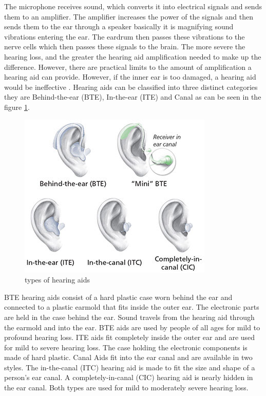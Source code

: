 \documentclass[sigconf]{acmart}
\begin{document}
The microphone receives sound, which converts it into electrical signals and sends them to an amplifier. The amplifier increases the power of the signals and then sends them to the ear through a speaker basically it is magnifying sound vibrations entering the ear. The eardrum then passes these vibrations to the nerve cells which then passes these signals to the brain. The more severe the hearing loss, and the greater the hearing aid amplification needed to make up the difference. However, there are practical limits to the amount of amplification a hearing aid can provide. However, if the inner ear is too damaged, a hearing aid would be ineffective \cite{NIHCD2017}.
\newline
Hearing aids can be classified into three distinct categories \cite{NIHCD2017} they are Behind-the-ear (BTE), In-the-ear (ITE) and Canal as can be seen in the figure \ref{f:typesofaids}.  
\begin{figure}[!ht]
  \centering\includegraphics[width=\columnwidth]{images/typesofaids.jpg}
  \caption{types of hearing aids}\label{f:typesofaids}
\end{figure}  
BTE hearing aids consist of a hard plastic case worn behind the ear and connected to a plastic earmold that fits inside the outer ear. The electronic parts are held in the case behind the ear. Sound travels from the hearing aid through the earmold and into the ear. BTE aids are used by people of all ages for mild to profound hearing loss. ITE aids fit completely inside the outer ear and are used for mild to severe hearing loss. The case holding the electronic components is made of hard plastic.  Canal Aids fit into the ear canal and are available in two styles. The in-the-canal (ITC) hearing aid is made to fit the size and shape of a person’s ear canal. A completely-in-canal (CIC) hearing aid is nearly hidden in the ear canal. Both types are used for mild to moderately severe hearing loss\cite{NIHCD2017}.
\end{document}
